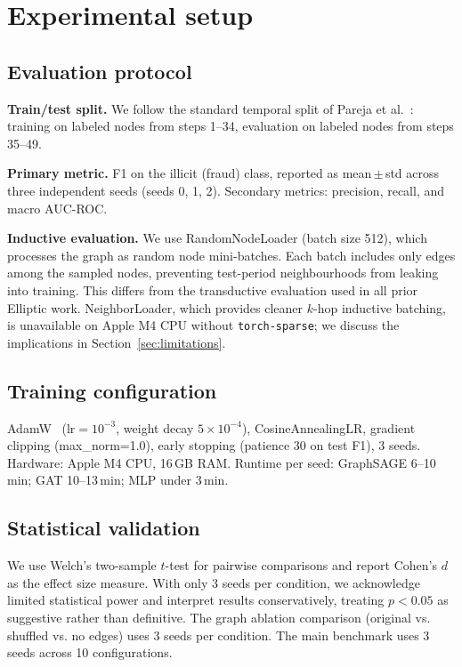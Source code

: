 \section{Experimental setup}
\label{sec:setup}

\subsection{Evaluation protocol}

\textbf{Train/test split.}  We follow the standard temporal split
of Pareja et al.~\citep{pareja2020evolvegcn}: training on labeled
nodes from steps 1--34, evaluation on labeled nodes from steps 35--49.

\textbf{Primary metric.}  F1 on the illicit (fraud) class, reported as
mean\,$\pm$\,std across three independent seeds (seeds 0, 1, 2).
Secondary metrics: precision, recall, and macro AUC-ROC.

\textbf{Inductive evaluation.}  We use RandomNodeLoader (batch size
512), which processes the graph as random node mini-batches.  Each
batch includes only edges among the sampled nodes, preventing
test-period neighbourhoods from leaking into training.  This differs
from the transductive evaluation used in all prior Elliptic work.
NeighborLoader, which provides cleaner $k$-hop inductive batching, is
unavailable on Apple M4 CPU without \texttt{torch-sparse}; we discuss
the implications in Section~\ref{sec:limitations}.

\subsection{Training configuration}

\begin{sloppypar}
AdamW~\citep{loshchilov2019adamw} ($\text{lr}=10^{-3}$, weight decay
$5{\times}10^{-4}$), CosineAnnealingLR, gradient clipping
(max\_norm=1.0), early stopping (patience 30 on test F1), 3 seeds.
Hardware: Apple M4 CPU, 16\,GB RAM.  Runtime per seed: GraphSAGE
6--10\,min; GAT 10--13\,min; MLP under 3\,min.
\end{sloppypar}

\subsection{Statistical validation}

We use Welch's two-sample $t$-test for pairwise comparisons and report
Cohen's $d$ as the effect size measure.  With only 3 seeds per
condition, we acknowledge limited statistical power and interpret
results conservatively, treating $p < 0.05$ as suggestive rather than
definitive.  The graph ablation comparison (original vs. shuffled vs.
no edges) uses 3 seeds per condition.  The main benchmark uses 3 seeds
across 10 configurations.

